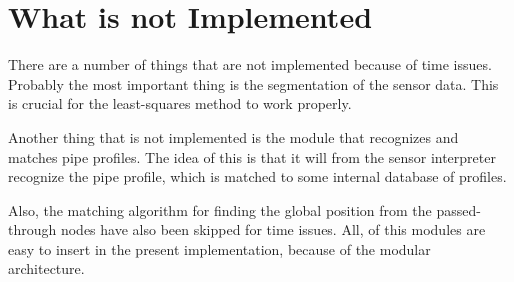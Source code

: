 \section{What is not Implemented}
There are a number of things that are not implemented because of time issues. Probably the
most important thing is the segmentation of the sensor data. This is crucial for the
least-squares method to work properly. 

Another thing that is not implemented is the module that recognizes and matches pipe
profiles. The idea of this is that it will from the sensor interpreter recognize the pipe
profile, which is matched to some internal database of profiles.

Also, the matching algorithm for finding the global position from the passed-through nodes
have also been skipped for time issues. All, of this modules are easy to insert in the
present implementation, because of the modular architecture. 



